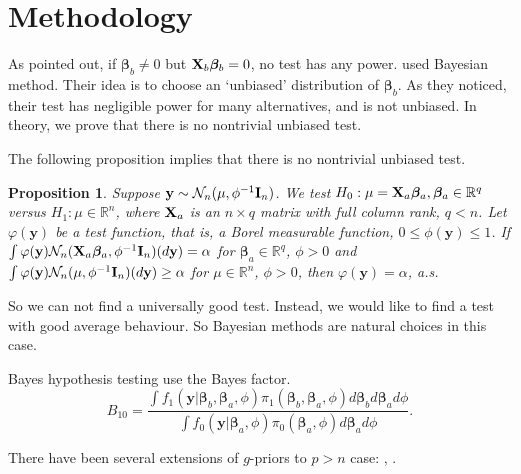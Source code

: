\documentclass[11pt]{article}
\newcommand{\By}{\mathbf{y}}    \newcommand{\Bz}{\mathbf{z}}
\newcommand{\bfsym}[1]{\ensuremath{\boldsymbol{#1}}}
\def\bbeta{\bfsym \beta}
\theoremstyle{plain}
\newtheorem{proposition}{\quad\quad Proposition}
\theoremstyle{definition}
\theoremstyle{remark}
\begin{document}
\section{Methodology}
As \cite{Goeman2006} pointed out, if $\bbeta_b \neq 0$ but $\BX_b \bbeta_b =0$, no test has any power.
\cite{Goeman2006} used Bayesian method.
Their idea is to choose an  `unbiased' distribution of $\bbeta_b$.
As they noticed, their test has negligible power for many alternatives, and is not unbiased.
In theory, we prove that there is no nontrivial unbiased test.


The following proposition implies that there is no nontrivial unbiased test.
\begin{proposition}\label{prop:unbiased}
Suppose
$\By\sim \mathcal N_n (\mu, \phi^{-1}\BI_n)$.
We test $H_0: \mu=\BX_a \bbeta_a, \bbeta_a \in \mathbb R^q$ versus
$H_1: \mu\in \mathbb R^n$, where $\mathbf{X}_a$ is an $n\times q$ matrix with full column rank, $q<n$.
Let $\varphi(\By)$ be a test function, that is, a Borel measurable function, $0\leq \phi(\By)\leq 1$.
If $\int\varphi(\By) \mathcal N_n (\BX_a\bbeta_a, \phi^{-1} \BI_n) (d\By)=\alpha$ for $\bbeta_a \in \mathbb R^q$, $\phi>0$ and $\int\varphi(\By) \mathcal N_n (\mu, \phi^{-1} \BI_n) (d\By) \geq \alpha$ for $\mu\in \mathbb R^n$, $\phi>0$, then $\varphi(\By)=\alpha$, a.s.
\end{proposition}

So we can not find a universally good test.
Instead, we would like to find a test with good average behaviour.
So Bayesian methods are natural choices in this case.




Bayes hypothesis testing use the Bayes factor.
\begin{equation*}
    B_{10}= \frac {
        \int f_1(\By|\bbeta_b ,\bbeta_a, \phi) \pi_1(\bbeta_b,\bbeta_a,\phi) d\bbeta_b d\bbeta_a d\phi
}{
        \int f_0(\By|\bbeta_a, \phi) \pi_0(\bbeta_a,\phi) d\bbeta_a d\phi
    }.
\end{equation*}

There have been several extensions of $g$-priors to $p>n$ case: \cite{maruyama2011}, \cite{Shang2011}.
\end{document}
